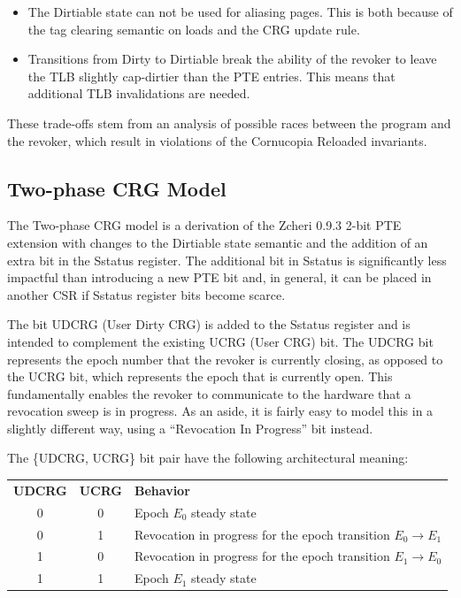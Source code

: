 \begin{itemize}
  \item The Dirtiable state can not be used for aliasing pages.
    This is both because of the tag clearing semantic on loads and the
    CRG update rule.
  \item Transitions from Dirty to Dirtiable break the
    ability of the revoker to leave the TLB slightly cap-dirtier than
    the PTE entries. This means that additional TLB invalidations are needed.
\end{itemize}

These trade-offs stem from an analysis of possible races between the program
and the revoker, which result in violations of the Cornucopia Reloaded
invariants.

\subsection{Two-phase CRG Model}
The Two-phase CRG model is a derivation of the Zcheri 0.9.3 2-bit PTE extension
with changes to the Dirtiable state semantic and the addition of an
extra bit in the Sstatus register.
The additional bit in Sstatus is significantly less impactful than introducing
a new PTE bit and, in general, it can be placed in another CSR if Sstatus
register bits become scarce.

The bit UDCRG (User Dirty CRG) is added to the Sstatus register and is intended
to complement the existing UCRG (User CRG) bit.
The UDCRG bit represents the epoch number that the revoker is currently closing,
as opposed to the UCRG bit, which represents the epoch that is currently open.
This fundamentally enables the revoker to communicate to the hardware that
a revocation sweep is in progress. As an aside, it is fairly easy to model
this in a slightly different way, using a ``Revocation In Progress''
bit instead.

The \{UDCRG, UCRG\} bit pair have the following architectural meaning:
\begin{center}
  \begin{tabular}{ccl}
    \textbf{UDCRG} & \textbf{UCRG} & \textbf{Behavior} \\
    0 & 0 & Epoch $E_0$ steady state \\
    0 & 1 & Revocation in progress for the epoch transition $E_0 \rightarrow E_1$ \\
    1 & 0 & Revocation in progress for the epoch transition $E_1 \rightarrow E_0$ \\
    1 & 1 & Epoch $E_1$ steady state \\
  \end{tabular}
\end{center}

